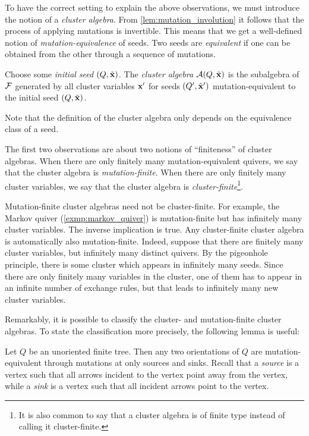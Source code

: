 To have the correct setting to explain the above observations, we must introduce the
notion of a \emph{cluster algebra}. From
\cref{lem:mutation_involution} it follows that the process of applying mutations is
invertible. This means that we get a well-defined notion of
\emph{mutation-equivalence} of seeds. Two seeds are
\emph{equivalent} if one can be obtained from the other through
a sequence of mutations.
\begin{definition}
	Choose some \emph{initial seed} $(Q, \tilde{\mathbf{x}})$.
	The \emph{cluster algebra} $\mathcal{A} (Q, \tilde{\mathbf{x}})$ is the subalgebra of $\mathcal{F}$ generated by
	all cluster variables $\mathbf{x}'$ for seeds $(Q', \tilde{\mathbf{x}}')$
	mutation-equivalent to the initial seed $(Q, \tilde{\mathbf{x}})$.
\end{definition}
\begin{remark}
	Note that the definition of
	the cluster algebra only depends on the equivalence class of a seed.
\end{remark}

The first two observations are about two notions of ``finiteness'' of cluster algebras.
When there are only finitely many mutation-equivalent quivers, we say that the cluster
algebra is \emph{mutation-finite}. When there are only finitely
many cluster variables, we say that the cluster algebra is
\emph{cluster-finite}\footnote{It is also common to say that a
	cluster algebra is of finite type instead of calling it cluster-finite.}.

Mutation-finite cluster algebras need not be cluster-finite. For example, the Markov
quiver (\cref{exmp:markov_quiver}) is mutation-finite but has infinitely many cluster
variables. The inverse implication is true. Any cluster-finite cluster algebra is
automatically also mutation-finite. Indeed, suppose that there are finitely many
cluster variables, but infinitely many distinct quivers. By the pigeonhole principle,
there is some cluster which appears in infinitely many seeds. Since there are only
finitely many variables in the cluster, one of them has to appear in an infinite number
of exchange rules, but that leads to infinitely many new cluster variables.

Remarkably, it is possible to classify the cluster- and mutation-finite cluster
algebras. To state the classification more precisely, the following lemma is useful:
\begin{lemma}
	Let $Q$ be an unoriented finite tree. Then any two orientations of $Q$ are mutation-equivalent through mutations at only sources and sinks. Recall that a \emph{source} is a vertex such that all arrows incident to the vertex point away from the vertex, while a \emph{sink} is a vertex such that all incident arrows point to the vertex.
\end{lemma}

